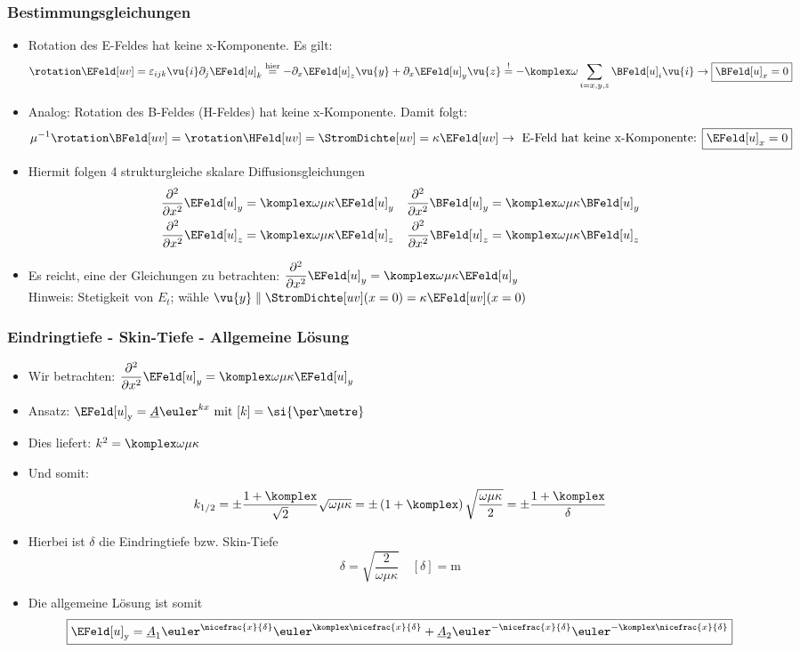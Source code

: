 \begin{frame}
  \frametitle{Bestimmungsgleichungen}
  \begin{itemize}[<+->]
  \item Rotation des E-Feldes hat keine x-Komponente. Es gilt:
$$
\rotation \EFeld[uv] = \varepsilon_{ijk} \vu{i} \partial_j\EFeld[u]_k \stackrel{\text{hier}}{=} -\partial_x\EFeld[u]_z \vu{y} + \partial_x\EFeld[u]_y \vu{z} \stackrel{!}{=} -\komplex\omega   \sum_{i=x,y,z}\BFeld[u]_i \vu{i} \to \boxed{\BFeld[u]_x=0}
$$
\item Analog: Rotation des B-Feldes (H-Feldes) hat keine x-Komponente. Damit folgt:
  $$
  \mu^{-1} \rotation\BFeld[uv] = \rotation \HFeld[uv] = \StromDichte[uv] = \kappa\EFeld[uv] \to \text{ E-Feld hat keine x-Komponente: } \boxed{\EFeld[u]_x=0} 
  $$
\item Hiermit folgen 4 strukturgleiche skalare Diffusionsgleichungen
 \begin{align*}
\dfrac{\partial^2}{\partial x^2} \EFeld[u]_y &= \komplex \omega \mu \kappa \EFeld[u]_y & \dfrac{\partial^2}{\partial x^2} \BFeld[u]_y &= \komplex \omega \mu \kappa \BFeld[u]_y \\
\dfrac{\partial^2}{\partial x^2} \EFeld[u]_z &= \komplex \omega \mu \kappa \EFeld[u]_z & \dfrac{\partial^2}{\partial x^2} \BFeld[u]_z &= \komplex \omega \mu \kappa \BFeld[u]_z 
 \end{align*}
\item Es reicht, eine der Gleichungen zu betrachten: $\dfrac{\partial^2}{\partial x^2} \EFeld[u]_y = \komplex \omega \mu \kappa \EFeld[u]_y$ \\
  Hinweis: Stetigkeit von $E_t$; \alert{wähle} $\vu{y} \parallel \StromDichte[uv](x=0) = \kappa\EFeld[uv](x=0)$
  \end{itemize}
\end{frame}


\begin{frame}
  \frametitle{Eindringtiefe - Skin-Tiefe - Allgemeine Lösung}
  \begin{itemize}[<+->]
  \item Wir betrachten: $\dfrac{\partial^2}{\partial x^2} \EFeld[u]_y = \komplex \omega \mu \kappa \EFeld[u]_y$
  \item Ansatz: $\EFeld[u]_\mathrm{y} = \underline{A} \euler^{k x} \text{ mit } [k] = \si{\per\metre} $
  \item Dies liefert: $k^2 = \komplex \omega \mu \kappa$
    \item Und somit:
$$
	k_{1/2} = \pm \dfrac{1 + \komplex}{\sqrt{2}} \sqrt{\omega \mu \kappa}
		= \pm \left( 1 + \komplex \right) \sqrt{\dfrac{\omega \mu \kappa}{2}}
		= \pm \dfrac{1 + \komplex}{\delta}
$$
\item Hierbei ist $\delta$ die \alert{Eindringtiefe} bzw. \alert{Skin-Tiefe}
  $$
  \boxed{ \delta = \sqrt{\dfrac{2}{\omega \mu \kappa}} } \quad [\delta] =\si{\metre}
  $$
\item Die allgemeine Lösung ist somit
  $$
  \boxed{\EFeld[u]_\mathrm{y} = \underline{A}_1 \euler^{\nicefrac{x}{\delta}} \euler^{\komplex \nicefrac{x}{\delta}} + \underline{A}_2  \euler^{-\nicefrac{x}{\delta}} \euler^{-\komplex \nicefrac{x}{\delta}} }
  $$
  \end{itemize}
\end{frame}

